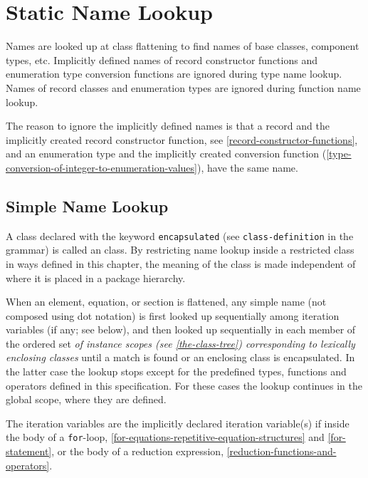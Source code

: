 \section{Static Name Lookup}\label{static-name-lookup}

Names are looked up at class flattening to find names of base classes,
component types, etc. Implicitly defined names of record constructor
functions and enumeration type conversion functions are ignored during
type name lookup. Names of record classes and enumeration types are ignored during function name lookup.

\begin{nonnormative}
The reason to ignore the implicitly defined names is that a record and the implicitly created record constructor function, see \cref{record-constructor-functions},
and an enumeration type and the implicitly created conversion function (\cref{type-conversion-of-integer-to-enumeration-values}), have the same name.
\end{nonnormative}

\subsection{Simple Name Lookup}\label{simple-name-lookup}

A class declared with the keyword \lstinline!encapsulated! (see \lstinline[language=grammar]!class-definition! in the grammar) is called an  class.
By restricting name lookup inside a restricted class in ways defined in this chapter, the meaning of the class is made independent of where it is placed in a package hierarchy.

When an element, equation, or section is flattened, any simple name (not composed using dot notation) is first looked up sequentially among iteration variables (if any; see below), and then looked up sequentially in each member of the ordered set \emph{of instance scopes (see \cref{the-class-tree}) corresponding to lexically enclosing classes} until a match is found or an enclosing class is encapsulated.
In the latter case the lookup stops except for the predefined types, functions and operators defined in this specification.
For these cases the lookup continues in the global scope, where they are defined.

The iteration variables are the implicitly declared iteration variable(s) if inside the body of a \lstinline!for!-loop, \cref{for-equations-repetitive-equation-structures} and \cref{for-statement}, or the body of a reduction expression, \cref{reduction-functions-and-operators}.

